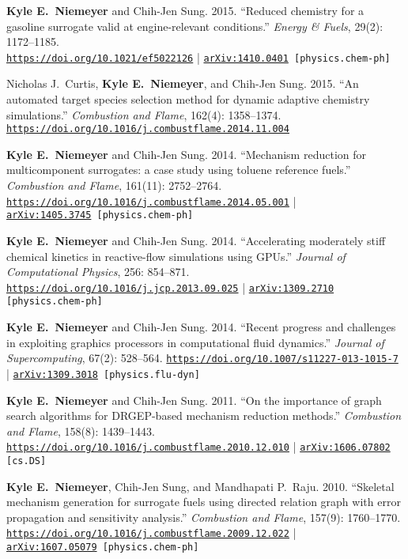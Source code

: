 \documentclass[margin,line,11pt]{res}
\makeatletter
\newlength{\bibhang}
\newlength{\bibsep}
 {\@listi \global\bibsep\itemsep \global\advance\bibsep by\parsep}
\newenvironment{bibenum*}
  {\renewcommand\labelenumi{\theenumi.}%
   \etaremune[
     topsep=0pt,
     itemsep=\bibsep,
     parsep=0pt,partopsep=0pt,
     itemindent=-\bibhang,
     leftmargin={\bibhang+\widthof{[999]}}]}
  {\endetaremune}
\newcommand*{\doi}[1]{\href{https://doi.org/#1}{\nolinkurl{https://doi.org/#1}}}
\makeatother
\begin{document}
\begin{resume}
\begin{bibenum*}
\item \textbf{Kyle E.\ Niemeyer} and Chih-Jen Sung.
2015.
``Reduced chemistry for a gasoline surrogate valid at engine-relevant conditions.''
\emph{Energy \& Fuels}, 29(2): 1172--1185. \\
\doi{10.1021/ef5022126} |
{\tt \href{http://arxiv.org/abs/1410.0401}{arXiv:1410.0401} [physics.chem-ph]}

\item Nicholas J.\ Curtis, \textbf{Kyle E.\ Niemeyer}, and Chih-Jen Sung.
2015.
``An automated target species selection method for dynamic adaptive chemistry simulations.''
\emph{Combustion and Flame}, 162(4): 1358--1374.
\doi{10.1016/j.combustflame.2014.11.004}

\item \textbf{Kyle E.\ Niemeyer} and Chih-Jen Sung.
2014.
``Mechanism reduction for multicomponent surrogates: a case study using toluene reference fuels.''
\emph{Combustion and Flame}, 161(11): 2752--2764.
\doi{10.1016/j.combustflame.2014.05.001} | \\
{\tt \href{http://arxiv.org/abs/1405.3745}{arXiv:1405.3745} [physics.chem-ph]}

\item \textbf{Kyle E.\ Niemeyer} and Chih-Jen Sung.
2014.
``Accelerating moderately stiff chemical kinetics in reactive-flow simulations using GPUs.''
\emph{Journal of Computational Physics}, 256: 854--871. \\
\doi{10.1016/j.jcp.2013.09.025} |
{\tt \href{http://arxiv.org/abs/1309.2710}{arXiv:1309.2710} [physics.chem-ph]}

\item \textbf{Kyle E.\ Niemeyer} and Chih-Jen Sung.
2014.
``Recent progress and challenges in exploiting graphics processors in computational fluid dynamics.''
\emph{Journal of Supercomputing}, 67(2): 528--564.
\doi{10.1007/s11227-013-1015-7} |
{\tt \href{http://arxiv.org/abs/1309.3018}{arXiv:1309.3018} [physics.flu-dyn]}

\item \textbf{Kyle E.\ Niemeyer} and Chih-Jen Sung.
2011.
``On the importance of graph search algorithms for DRGEP-based mechanism reduction methods.''
\emph{Combustion and Flame}, 158(8): 1439--1443.
\doi{10.1016/j.combustflame.2010.12.010} |
{\tt \href{http://arxiv.org/abs/1606.07802}{arXiv:1606.07802} [cs.DS]}

\item \textbf{Kyle E.\ Niemeyer}, Chih-Jen Sung, and Mandhapati P.\ Raju.
2010.
``Skeletal mechanism generation for surrogate fuels using directed relation graph with error propagation and sensitivity analysis.''
\emph{Combustion and Flame}, 157(9): 1760--1770. \\
\doi{10.1016/j.combustflame.2009.12.022} | \\
{\tt \href{http://arxiv.org/abs/1607.05079}{arXiv:1607.05079} [physics.chem-ph]}


\end{bibenum*}
\end{resume}
\end{document}
